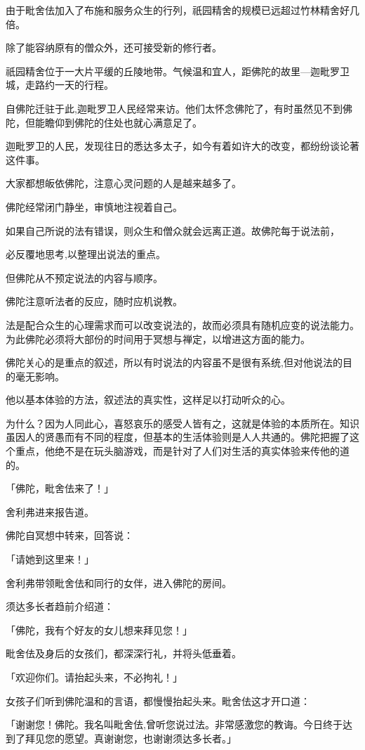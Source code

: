 \documentclass[twoside,openany]{book}
\begin{document}
由于毗舍佉加入了布施和服务众生的行列，祇园精舍的规模已远超过竹林精舍好几倍。

除了能容纳原有的僧众外，还可接受新的修行者。

祇园精舍位于一大片平缓的丘陵地带。气候温和宜人，距佛陀的故里—迦毗罗卫城，走路约一天的行程。

自佛陀迁驻于此,迦毗罗卫人民经常来访。他们太怀念佛陀了，有时虽然见不到佛陀，但能瞻仰到佛陀的住处也就心满意足了。

迦毗罗卫的人民，发现往日的悉达多太子，如今有着如许大的改变，都纷纷谈论著这件事。

大家都想皈依佛陀，注意心灵问题的人是越来越多了。

佛陀经常闭门静坐，审慎地注视着自己。

如果自己所说的法有错误，则众生和僧众就会远离正道。故佛陀每于说法前，

必反覆地思考,以整理出说法的重点。

但佛陀从不预定说法的内容与顺序。

佛陀注意听法者的反应，随时应机说教。

法是配合众生的心理需求而可以改变说法的，故而必须具有随机应变的说法能力。为此佛陀必须将大部份的时间用于冥想与禅定，以增进这方面的能力。

佛陀关心的是重点的叙述，所以有时说法的内容虽不是很有系统,但对他说法的目的毫无影响。

他以基本体验的方法，叙述法的真实性，这样足以打动听众的心。

为什么？因为人同此心，喜怒哀乐的感受人皆有之，这就是体验的本质所在。知识虽因人的贤愚而有不同的程度，但基本的生活体验则是人人共通的。佛陀把握了这个重点，他绝不是在玩头脑游戏，而是针对了人们对生活的真实体验来传他的道的。

「佛陀，毗舍佉来了！」

舍利弗进来报告道。

佛陀自冥想中转来，回答说：

「请她到这里来！」

舍利弗带领毗舍佉和同行的女伴，进入佛陀的房间。

须达多长者趋前介绍道：

「佛陀，我有个好友的女儿想来拜见您！」

毗舍佉及身后的女孩们，都深深行礼，并将头低垂着。

「欢迎你们。请抬起头来，不必拘礼！」

女孩子们听到佛陀温和的言语，都慢慢抬起头来。毗舍佉这才开口道：

「谢谢您！佛陀。我名叫毗舍佉,曾听您说过法。非常感激您的教诲。今日终于达到了拜见您的愿望。真谢谢您，也谢谢须达多长者。」
\end{document}
